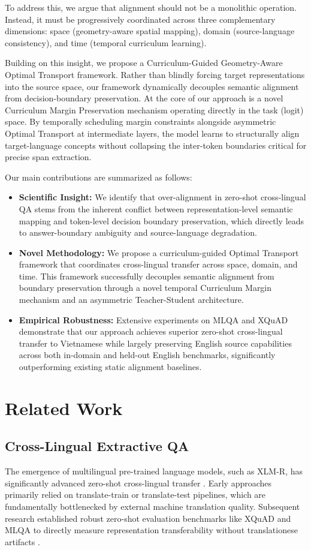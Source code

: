 \documentclass[11pt]{article}
\begin{document}
To address this, we argue that alignment should not be a monolithic operation. Instead, it must be progressively coordinated across three complementary dimensions: space (geometry-aware spatial mapping), domain (source-language consistency), and time (temporal curriculum learning).

Building on this insight, we propose a Curriculum-Guided Geometry-Aware Optimal Transport framework. Rather than blindly forcing target representations into the source space, our framework dynamically decouples semantic alignment from decision-boundary preservation. At the core of our approach is a novel Curriculum Margin Preservation mechanism operating directly in the task (logit) space. By temporally scheduling margin constraints alongside asymmetric Optimal Transport at intermediate layers, the model learns to structurally align target-language concepts without collapsing the inter-token boundaries critical for precise span extraction.

Our main contributions are summarized as follows:
\begin{itemize}
    \item \textbf{Scientific Insight:} We identify that over-alignment in zero-shot cross-lingual QA stems from the inherent conflict between representation-level semantic mapping and token-level decision boundary preservation, which directly leads to answer-boundary ambiguity and source-language degradation.
    \item \textbf{Novel Methodology:} We propose a curriculum-guided Optimal Transport framework that coordinates cross-lingual transfer across space, domain, and time. This framework successfully decouples semantic alignment from boundary preservation through a novel temporal Curriculum Margin mechanism and an asymmetric Teacher-Student architecture.
    \item \textbf{Empirical Robustness:} Extensive experiments on MLQA and XQuAD demonstrate that our approach achieves superior zero-shot cross-lingual transfer to Vietnamese while largely preserving English source capabilities across both in-domain and held-out English benchmarks, significantly outperforming existing static alignment baselines.
\end{itemize}

\section{Related Work}

\subsection{Cross-Lingual Extractive QA}
The emergence of multilingual pre-trained language models, such as XLM-R, has significantly advanced zero-shot cross-lingual transfer \cite{conneau-etal-2020-unsupervised}. Early approaches primarily relied on translate-train or translate-test pipelines, which are fundamentally bottlenecked by external machine translation quality. Subsequent research established robust zero-shot evaluation benchmarks like XQuAD and MLQA to directly measure representation transferability without translationese artifacts \cite{artetxe-etal-2020-cross, lewis-etal-2020-mlqa}. 
\end{document}
